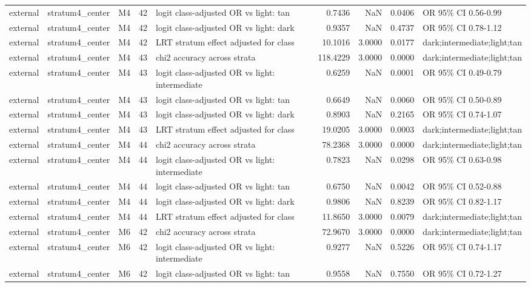 \begin{tabular}{lllrlrrrl}
external & stratum4\_center & M4 & 42 & logit class-adjusted OR vs light: tan & 0.7436 & NaN & 0.0406 & OR 95\% CI 0.56-0.99 \\
external & stratum4\_center & M4 & 42 & logit class-adjusted OR vs light: dark & 0.9357 & NaN & 0.4737 & OR 95\% CI 0.78-1.12 \\
external & stratum4\_center & M4 & 42 & LRT stratum effect adjusted for class & 10.1016 & 3.0000 & 0.0177 & dark;intermediate;light;tan \\
external & stratum4\_center & M4 & 43 & chi2 accuracy across strata & 118.4229 & 3.0000 & 0.0000 & dark;intermediate;light;tan \\
external & stratum4\_center & M4 & 43 & logit class-adjusted OR vs light: intermediate & 0.6259 & NaN & 0.0001 & OR 95\% CI 0.49-0.79 \\
external & stratum4\_center & M4 & 43 & logit class-adjusted OR vs light: tan & 0.6649 & NaN & 0.0060 & OR 95\% CI 0.50-0.89 \\
external & stratum4\_center & M4 & 43 & logit class-adjusted OR vs light: dark & 0.8903 & NaN & 0.2165 & OR 95\% CI 0.74-1.07 \\
external & stratum4\_center & M4 & 43 & LRT stratum effect adjusted for class & 19.0205 & 3.0000 & 0.0003 & dark;intermediate;light;tan \\
external & stratum4\_center & M4 & 44 & chi2 accuracy across strata & 78.2368 & 3.0000 & 0.0000 & dark;intermediate;light;tan \\
external & stratum4\_center & M4 & 44 & logit class-adjusted OR vs light: intermediate & 0.7823 & NaN & 0.0298 & OR 95\% CI 0.63-0.98 \\
external & stratum4\_center & M4 & 44 & logit class-adjusted OR vs light: tan & 0.6750 & NaN & 0.0042 & OR 95\% CI 0.52-0.88 \\
external & stratum4\_center & M4 & 44 & logit class-adjusted OR vs light: dark & 0.9806 & NaN & 0.8239 & OR 95\% CI 0.82-1.17 \\
external & stratum4\_center & M4 & 44 & LRT stratum effect adjusted for class & 11.8650 & 3.0000 & 0.0079 & dark;intermediate;light;tan \\
external & stratum4\_center & M6 & 42 & chi2 accuracy across strata & 72.9670 & 3.0000 & 0.0000 & dark;intermediate;light;tan \\
external & stratum4\_center & M6 & 42 & logit class-adjusted OR vs light: intermediate & 0.9277 & NaN & 0.5226 & OR 95\% CI 0.74-1.17 \\
external & stratum4\_center & M6 & 42 & logit class-adjusted OR vs light: tan & 0.9558 & NaN & 0.7550 & OR 95\% CI 0.72-1.27 \\

\end{tabular}
